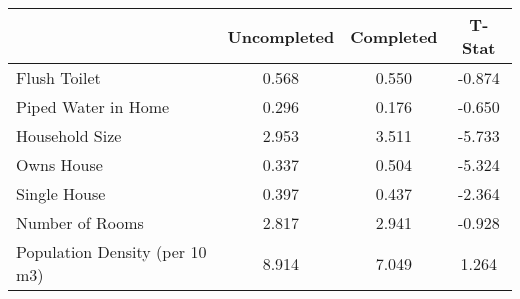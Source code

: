 \begin{tabular}{l*{1}{ccc}}
 &Uncompleted &Completed &T-Stat  \\
\hline 
Flush Toilet &      0.568 &      0.550 &     -0.874  \\
Piped Water in Home &      0.296 &      0.176 &     -0.650  \\
Household Size &      2.953 &      3.511 &     -5.733  \\
Owns House &      0.337 &      0.504 &     -5.324  \\
Single House &      0.397 &      0.437 &     -2.364  \\
Number of Rooms &      2.817 &      2.941 &     -0.928  \\
Population Density (per 10 m3) &      8.914 &      7.049 &      1.264  \\
\hline
\end{tabular}